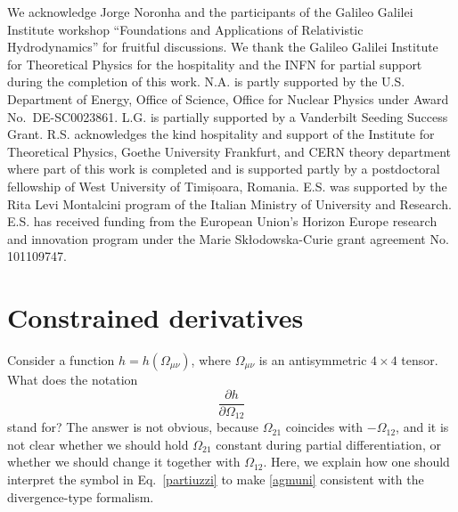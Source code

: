 \documentclass[12pt,aps,prd,nofootinbib,noshowkeys,noshowpacs,longbibliography,
superscriptaddress,tightenlines,floatfix,preprintnumbers]{revtex4-2}
\begin{document}
\begin{acknowledgments}
We acknowledge Jorge Noronha and the participants of the Galileo Galilei Institute workshop ``Foundations and Applications of Relativistic Hydrodynamics''  for fruitful discussions. We thank the Galileo Galilei Institute for Theoretical Physics for the hospitality and the INFN for partial support during the completion of this work. N.A. is partly supported by the U.S. Department of Energy, Office of Science, Office for Nuclear Physics under Award No.~DE-SC0023861. L.G. is partially supported by a Vanderbilt Seeding Success Grant. R.S. acknowledges the kind hospitality and support of the Institute for Theoretical Physics, Goethe University Frankfurt, and CERN theory department where part of this work is completed and is supported partly by a postdoctoral fellowship of West University of Timișoara, Romania. E.S. was supported by the Rita Levi Montalcini program of the Italian Ministry of University and Research. E.S. has received funding from the European Union’s Horizon Europe research and innovation program under the Marie Sk\l odowska-Curie grant agreement No. 101109747. 
\end{acknowledgments}

\appendix



\section{Constrained derivatives}\label{AAA}

Consider a function $h=h(\Omega_{\mu \nu})$, where $\Omega_{\mu \nu}$ is an antisymmetric $4\times 4$ tensor. What does the notation
\begin{equation}\label{partiuzzi}
\dfrac{\partial h}{\partial \Omega_{12}}
\end{equation}
stand for? The answer is not obvious, because $\Omega_{21}$ coincides with $-\Omega_{12}$, and it is not clear whether we should hold $\Omega_{21}$ constant during partial differentiation, or whether we should change it together with $\Omega_{12}$. Here, we explain how one should interpret the symbol in Eq.~\eqref{partiuzzi} to make \eqref{agmuni} consistent with the divergence-type formalism.
\end{document}
